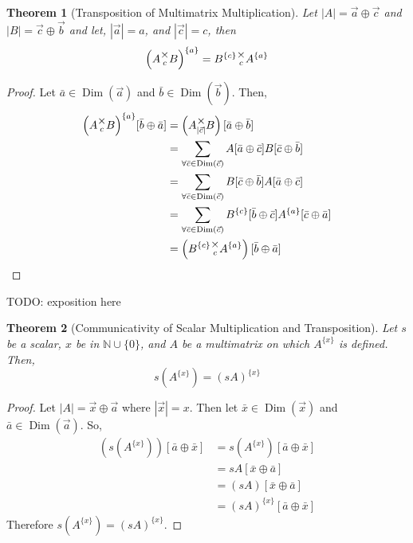 \documentclass[12pt]{book}
\theoremstyle{plain}
\newtheorem{theorem}{Theorem}[chapter]
\theoremstyle{definition}
\theoremstyle{ppart}
\theoremstyle{case}
\theoremstyle{solution}
\DeclareMathOperator{\Dim}{Dim}
\newcommand{\mmult}[1]{\text{\raisebox{1ex}{$\underset{#1}{\times}$}}}
\newcommand{\shape}[1]{\left|#1\right|}
\newcommand{\transpose}[2]{{#1}^{\{#2\}}}
\begin{document}
\begin{theorem}[Transposition of Multimatrix Multiplication]
\label{mm_tran_mult}
Let $\shape{A} = \vec{a} \oplus \vec{c}$ and $\shape{B} = \vec{c} \oplus \vec{b}$ and let,
$\shape{\vec{a}} = a$, and $\shape{\vec{c}} = c$, then
\[
 \transpose{\left(A \mmult{c} B\right)}{a}
 =  \transpose{B}{c} \mmult{c} \transpose{A}{a}
\]
\end{theorem}
\begin{proof}
Let $\bar{a} \in \Dim(\vec{a})$ and $\bar{b} \in \Dim(\vec{b})$.
Then,
\begin{align*}
	\transpose{\left(A \mmult{c} B\right)}{a}[\bar{b} \oplus \bar{a}]
	&=
	\left(A \mmult{\shape{\vec{c}}} B \right)[\bar{a} \oplus \bar{b}] \\
	&=
	\sum_{\forall \bar{c} \in \Dim(\vec{c})}
	A[\bar{a} \oplus \bar{c}] B[\bar{c} \oplus \bar{b}] \\
	&=
	\sum_{\forall \bar{c} \in \Dim(\vec{c})}
	B[\bar{c} \oplus \bar{b}] A[\bar{a} \oplus \bar{c}] \\
	&=
	\sum_{\forall \bar{c} \in \Dim(\vec{c})}
	\transpose{B}{c}[\bar{b} \oplus \bar{c}]
	\transpose{A}{a}[\bar{c} \oplus \bar{a}] \\
	&=
	\left(\transpose{B}{c} \mmult{c} \transpose{A}{a}\right)
	[\bar{b} \oplus \bar{a}]
\end{align*}
\end{proof}

TODO: exposition here

\begin{theorem}[Communicativity of Scalar Multiplication and Transposition]
Let $s$ be a scalar, $x$ be in $\mathbb{N} \cup \{0\}$, and $A$ be
a multimatrix on which $\transpose{A}{x}$ is defined. Then,
\[ s\left(\transpose{A}{x}\right) = \transpose{(sA)}{x} \]
\end{theorem}
\begin{proof}
Let $\shape{A} = \vec{x} \oplus \vec{a}$ where $\shape{\vec{x}} = x$. Then
let $\bar{x} \in \Dim(\vec{x})$ and $\bar{a} \in \Dim(\vec{a})$. So,
\begin{align*}
  \left(s\left(\transpose{A}{x}\right)\right)[\bar{a} \oplus \bar{x}]
  &= s \left(\transpose{A}{x}\right)[\bar{a} \oplus \bar{x}] \\
  &= s A[\bar{x} \oplus \bar{a}] \\
  &= (s A)[\bar{x} \oplus \bar{a}] \\
  &= \transpose{(sA)}{x}[\bar{a} \oplus \bar{x}]
\end{align*}
Therefore $s\left(\transpose{A}{x}\right) = \transpose{(sA)}{x}$.
\end{proof}
\end{document}
